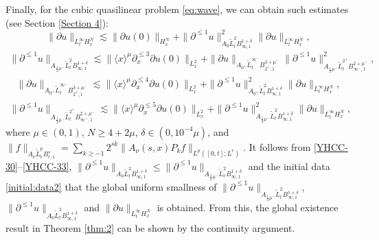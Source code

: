 \documentclass[11pt,twoside]{article}
\def\ds{\displaystyle}
\def\f{\frac}
\def\p{\partial}
\def\ls{\lesssim}
\newcommand{\w}[1]{\langle {#1} \rangle}
\theoremstyle{plain}
\theoremstyle{definition}
\numberwithin{equation}{section}
\begin{document}
Finally, for the cubic quasilinear problem \eqref{eq:wave}, we can obtain such estimates (see Section \ref{Section 4}):
\begin{equation}\label{YHCC-30}
\|\partial u\|_{L^\infty_tH^{N}_x} \lesssim \|\partial u(0)\|_{H^{N}_x}
+\| \partial^{\le1} u\|_{A_0\tilde{L}^2_t B^{1+\delta}_{\infty,1} } ^2 \|\partial u\|_{L^\infty_tH^{N}_x},
\end{equation}
\begin{equation}\label{YHCC-31}
\begin{split}
\|\partial^{\le1} u\|_{A_{\f12\mu^-}\tilde{L}^2_t B^{1+\delta}_{\infty,1} }
\ls
\|\w{x}^{\mu}\p^{\le3}_x\p u(0)\|_{L^2_x}
+\| \partial u\|_{A_{0^+}\tilde{L}^{\infty^-}_t B^{3+\mu^-}_{2^+,1} }
\| \partial^{\le1} u\|_{A_{\f12\mu^-}\tilde{L}^{2^+}_t B^{2+\mu^-}_{\infty^-,1} }^2,
\end{split}
\end{equation}
\begin{equation}\label{YHCC-32}
	\begin{split}
		\| \partial u\|_{A_{0^+}\tilde{L}^{\infty^-}_t B^{3+\mu^-}_{2^+,1} }
		\ls
		\|\w{x}^{\mu}\p^{\le4}_x\p u(0)\|_{L^2_x}
		+
		\| \partial^{\le1} u\|_{A_{0^+}\tilde{L}^2_t B^{1+\delta}_{\infty,1} }^2
		\|\p u\|_{L^\infty_tH^{N}_x},
	\end{split}
\end{equation}
\begin{equation}\label{YHCC-33}
	\begin{split}
		\| \partial^{\le1} u\|_{A_{\f12\mu^-}\tilde{L}^{2^+}_t B^{2+\mu^-}_{\infty^-,1} }
		\ls
		\|\w{x}^{\mu}\p^{\le5}_x\p u(0)\|_{L^2_x}
		+
		\| \partial^{\le1} u\|_{A_{\f12\mu^-}\tilde{L}^2_t B^{1+\delta}_{\infty,1} }^2
		\|\p u\|_{L^\infty_tH^{N}_x},
	\end{split}
\end{equation}
where $\mu\in(0,1)$, $N\ge 4+2\mu$, $\delta\in(0,10^{-4}\mu)$, and
$\|f\|_{A_\nu \tilde{L}^p_t B^s_{r,1}}=\ds\sum_{k\ge-1}2^{sk}\|A_\nu(s,x)P_k f\|_{L^p([0,t];L^r)}$.
It follows from \eqref{YHCC-30}--\eqref{YHCC-33}, $\|\partial^{\le1} u\|_{A_0\tilde{L}^2_t B^{1+\delta}_{\infty,1}}\le \|\partial^{\le1} u\|_{A_{\f12\mu^-}\tilde{L}^2_t B^{1+\delta}_{\infty,1}}$  and the initial data \eqref{initial:data2} that
the global uniform smallness of $\|\partial^{\le1} u\|_{A_{\f12\mu^-}\tilde{L}^2_t B^{1+\delta}_{\infty,1}}$, $\|\p^{\le1} u\|_{A_0\tilde{L}^2_t B^{1+\delta}_{\infty,1}}$ and $\|\partial u\|_{L^\infty_tH^{N}_x}$ is obtained.
From this, the global existence result in Theorem \ref{thm:2} can be shown by the continuity argument.
\end{document}
